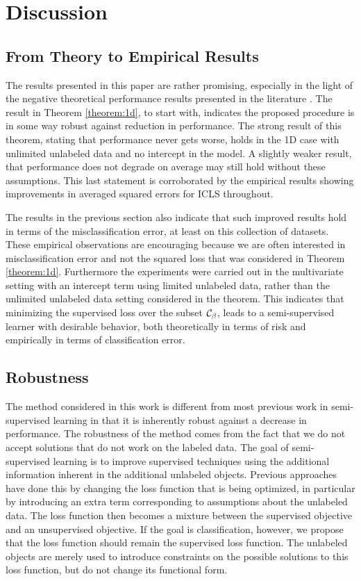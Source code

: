 \documentclass{elsarticle}
\begin{document}
\section{Discussion}
\subsection*{From Theory to Empirical Results}
The results presented in this paper are rather promising, especially in the light of the negative theoretical performance results presented in the literature \cite{Cozman2006}. The result in Theorem \ref{theorem:1d}, to start with, indicates the proposed procedure is in some way robust against reduction in performance. The strong result of this theorem, stating that performance never gets worse, holds in the 1D case with unlimited unlabeled data and no intercept in the model. A slightly weaker result, that performance does not degrade on average may still hold without these assumptions. This last statement is corroborated by the empirical results showing improvements in averaged squared errors for ICLS throughout.

The results in the previous section also indicate that such improved results hold in terms of the misclassification error, at least on this collection of datasets. These empirical observations are encouraging because we are often interested in misclassification error and not the squared loss that was considered in Theorem \ref{theorem:1d}. Furthermore the experiments were carried out in the multivariate setting with an intercept term using limited unlabeled data, rather than the unlimited unlabeled data setting considered in the theorem. This indicates that minimizing the supervised loss over the subset $\mathcal{C}_{\beta}$, leads to a semi-supervised learner with desirable behavior, both theoretically in terms of risk and empirically in terms of classification error.

\subsection*{Robustness}
The method considered in this work is different from most previous work in semi-supervised learning in that it is inherently robust against a decrease in performance. 
The robustness of the method comes from the fact that we do not accept solutions that do not work on the labeled data. The goal of semi-supervised learning is to improve supervised techniques using the additional information inherent in the additional unlabeled objects. Previous approaches have done this by changing the loss function that is being optimized, in particular by introducing an extra term corresponding to assumptions about the unlabeled data. The loss function then becomes a mixture between the supervised objective and an unsupervised objective. If the goal is classification, however, we propose that the loss function should remain the supervised loss function. The unlabeled objects are merely used to introduce constraints on the possible solutions to this loss function, but do not change its functional form.
\end{document}
